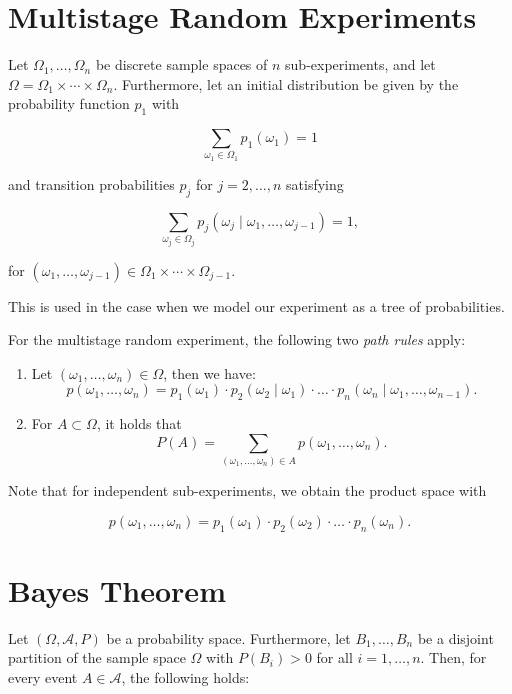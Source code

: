 \section{Multistage Random Experiments}

Let \(\Omega_1, \ldots, \Omega_n\) be discrete sample spaces of \(n\) sub-experiments, and let \(\Omega = \Omega_1 \times \cdots \times \Omega_n\).
Furthermore, let an initial distribution be given by the probability function \(p_1\) with

\[
    \sum_{\omega_1 \in \Omega_1} p_1(\omega_1) = 1
\]

and transition probabilities \(p_j\) for \(j = 2, \ldots, n\) satisfying

\[
    \sum_{\omega_j \in \Omega_j} p_j(\omega_j \mid \omega_1, \ldots, \omega_{j-1}) = 1,
\]

for \((\omega_1, \ldots, \omega_{j-1}) \in \Omega_1 \times \cdots \times \Omega_{j-1}\).

This is used in the case when we model our experiment as a tree of probabilities.

For the multistage random experiment, the following two \emph{path rules} apply:

\begin{enumerate}

    \item Let \((\omega_1, \ldots, \omega_n) \in \Omega\), then we have:
	\[
	    p(\omega_1, \ldots, \omega_n)
	    = p_1(\omega_1) \cdot p_2(\omega_2 \mid \omega_1) \cdot \ldots \cdot p_n(\omega_n \mid \omega_1, \ldots, \omega_{n-1}).
	\]

    \item For \(A \subset \Omega\), it holds that
	\[
	    P(A) = \sum_{(\omega_1, \ldots, \omega_n) \in A} p(\omega_1, \ldots, \omega_n).
	\]

\end{enumerate}

Note that for independent sub-experiments, we obtain the product space with

\[
    p(\omega_1, \ldots, \omega_n)
    = p_1(\omega_1) \cdot p_2(\omega_2) \cdot \ldots \cdot p_n(\omega_n).
\]

\section{Bayes Theorem}

Let \((\Omega, \mathcal{A}, P)\) be a probability space. Furthermore, let \(B_1, \ldots, B_n\) be a disjoint partition of the sample space \(\Omega\) 
with \(P(B_i) > 0\) for all \(i = 1, \ldots, n\). Then, for every event \(A \in \mathcal{A}\), the following holds:

